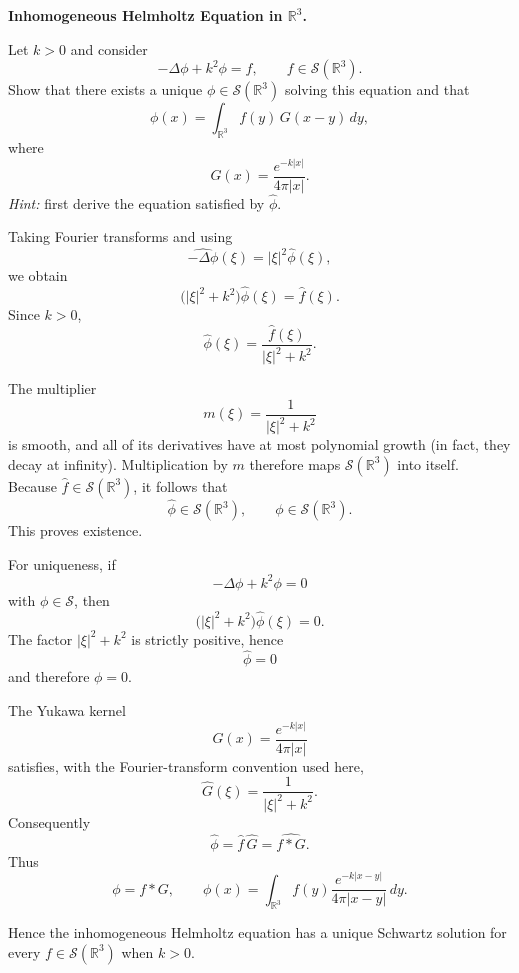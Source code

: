 \begin{problem}[CP-II-0237]
\label{prob:cp-ii-0237}
\textbf{Inhomogeneous Helmholtz Equation in \(\mathbb{R}^3\).}

\hspace*{1.5em}Let \(k>0\) and consider
\[
-\Delta \phi + k^{2}\phi = f,
\qquad
f\in\mathcal{S}(\mathbb{R}^3).
\]
Show that there exists a unique \(\phi\in\mathcal{S}(\mathbb{R}^3)\) solving this
equation and that
\[
\phi(x)
=
\int_{\mathbb{R}^3} f(y)\,G(x-y)\,dy,
\]
where
\[
G(x)
=
\frac{e^{-k|x|}}{4\pi |x|}.
\]
\emph{Hint:} first derive the equation satisfied by \(\widehat{\phi}\).
\end{problem}

\begin{solution}
Taking Fourier transforms and using
\[
\widehat{-\Delta\phi}(\xi)
=
|\xi|^2\widehat{\phi}(\xi),
\]
we obtain
\[
\bigl(|\xi|^2+k^2\bigr)\widehat{\phi}(\xi)
=
\widehat f(\xi).
\]
Since \(k>0\),
\[
\widehat{\phi}(\xi)
=
\frac{\widehat f(\xi)}{|\xi|^2+k^2}.
\]

The multiplier
\[
m(\xi)=\frac1{|\xi|^2+k^2}
\]
is smooth, and all of its derivatives have at most polynomial growth (in fact,
they decay at infinity). Multiplication by \(m\) therefore maps
\(\mathcal S(\mathbb R^3)\) into itself. Because
\(\widehat f\in\mathcal S(\mathbb R^3)\), it follows that
\[
\widehat\phi\in\mathcal S(\mathbb R^3),
\qquad
\phi\in\mathcal S(\mathbb R^3).
\]
This proves existence.

For uniqueness, if
\[
-\Delta\phi+k^2\phi=0
\]
with \(\phi\in\mathcal S\), then
\[
\bigl(|\xi|^2+k^2\bigr)\widehat\phi(\xi)=0.
\]
The factor \(|\xi|^2+k^2\) is strictly positive, hence
\[
\widehat\phi=0
\]
and therefore \(\phi=0\).

The Yukawa kernel
\[
G(x)
=
\frac{e^{-k|x|}}{4\pi|x|}
\]
satisfies, with the Fourier-transform convention used here,
\[
\widehat G(\xi)
=
\frac1{|\xi|^2+k^2}.
\]
Consequently
\[
\widehat\phi
=
\widehat f\,\widehat G
=
\widehat{f*G}.
\]
Thus
\[
\boxed{
\phi=f*G,
\qquad
\phi(x)
=
\int_{\mathbb R^3}
f(y)\frac{e^{-k|x-y|}}{4\pi|x-y|}\,dy.
}
\]

Hence the inhomogeneous Helmholtz equation has a unique Schwartz solution for
every \(f\in\mathcal S(\mathbb R^3)\) when \(k>0\).
\end{solution}



